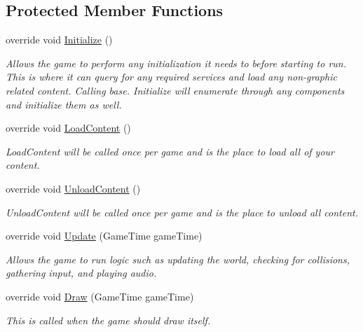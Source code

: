 \subsection*{Protected Member Functions}
\begin{DoxyCompactItemize}
\item 
override void \hyperlink{class_hel_project_1_1_main_game_ada9330a851988897b9e0832853e34950}{Initialize} ()
\begin{DoxyCompactList}\small\item\em Allows the game to perform any initialization it needs to before starting to run. This is where it can query for any required services and load any non-\/graphic related content. Calling base. Initialize will enumerate through any components and initialize them as well. \end{DoxyCompactList}\item 
override void \hyperlink{class_hel_project_1_1_main_game_a2bc21b348062dd85d99efd3822af3e6a}{Load\+Content} ()
\begin{DoxyCompactList}\small\item\em Load\+Content will be called once per game and is the place to load all of your content. \end{DoxyCompactList}\item 
override void \hyperlink{class_hel_project_1_1_main_game_a39242071cf9919f8a8641be9e8396634}{Unload\+Content} ()
\begin{DoxyCompactList}\small\item\em Unload\+Content will be called once per game and is the place to unload all content. \end{DoxyCompactList}\item 
override void \hyperlink{class_hel_project_1_1_main_game_a9ac722d731f12668bb191921101dbba5}{Update} (Game\+Time game\+Time)
\begin{DoxyCompactList}\small\item\em Allows the game to run logic such as updating the world, checking for collisions, gathering input, and playing audio. \end{DoxyCompactList}\item 
override void \hyperlink{class_hel_project_1_1_main_game_a8c0f9655e1d757dad7c35cf5a4529035}{Draw} (Game\+Time game\+Time)
\begin{DoxyCompactList}\small\item\em This is called when the game should draw itself. \end{DoxyCompactList}\end{DoxyCompactItemize}

